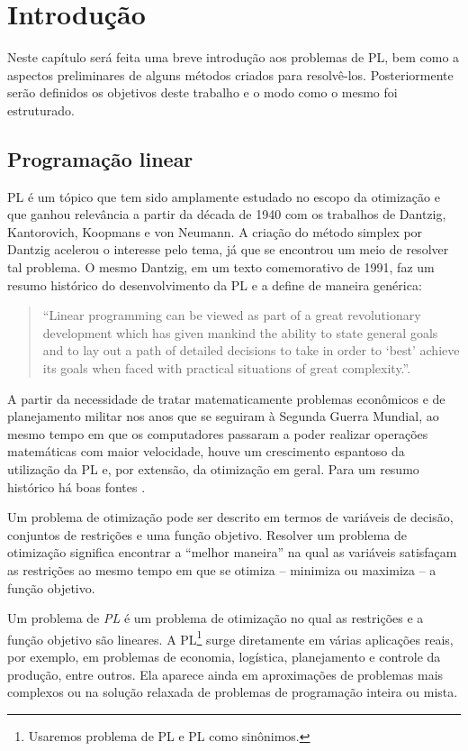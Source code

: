 \chapter{Introdução}


Neste capítulo será feita uma breve introdução aos problemas de
 \ac{PL}, bem como a aspectos preliminares de
alguns métodos criados para resolvê-los. Posteriormente  serão definidos os
objetivos deste trabalho e o modo como o mesmo foi estruturado.


\section{Programação linear}  
   
\acl{PL} é um tópico que tem sido amplamente estudado no escopo da otimização e
que ganhou relevância a partir da década de 1940 com os trabalhos de Dantzig,
Kantorovich, Koopmans e von Neumann. A criação do método simplex por Dantzig 
acelerou o interesse pelo tema, já que se encontrou um meio de resolver tal problema. O
mesmo Dantzig, em um texto comemorativo de 1991, faz um resumo histórico do
desenvolvimento da \ac{PL} e a define de maneira genérica:
\begin{quotation} 
\small``Linear programming can be viewed as part of a great
revolutionary development which has given mankind the ability to state general
goals and to lay out a path of detailed decisions to take in order to
 `best' achieve its goals when faced with practical situations of great
complexity.''\cite{Dantzig:2002td}. 
\end{quotation}  
A partir da necessidade de tratar matematicamente problemas econômicos
e de planejamento militar nos anos que se seguiram à Segunda Guerra Mundial, ao
mesmo tempo em que os computadores passaram a poder realizar operações
matemáticas com maior velocidade, houve um crescimento espantoso da utilização
da \ac{PL} e, por extensão, da otimização em geral. Para um resumo histórico há
boas fontes
\cite{Schrijver:Theory-of-Linear:1986k,Dantzig:Linear-Programming:1963t}.

Um problema de otimização pode ser descrito em termos de variáveis de decisão,
conjuntos de restrições e uma função objetivo. Resolver um problema de
otimização significa encontrar a ``melhor maneira'' na qual as variáveis
satisfaçam as restrições ao mesmo tempo em que se otimiza -- 
minimiza ou maximiza --  a função objetivo. 
 
Um problema de \emph{\acl{PL}}  é um problema de otimização no qual as
restrições e a função objetivo são lineares. A \ac{PL}\footnote{Usaremos
problema de PL e PL como sinônimos.} surge diretamente em várias aplicações
reais, por exemplo, em problemas de economia, logística, planejamento e controle
da produção, entre outros. Ela aparece ainda em aproximações de problemas mais
complexos ou na solução relaxada de problemas de programação inteira ou mista.


